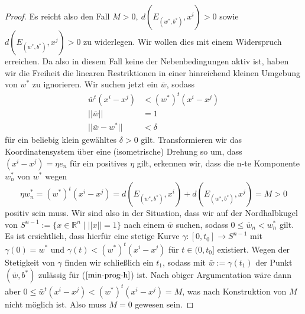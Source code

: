 \begin{proof}
	Es reicht also den Fall $M>0,\ d(E_{(w^*,b^*)},x^i) > 0$ sowie $d(E_{(w^*,b^*)},x^j) > 0$ zu widerlegen. Wir wollen dies mit einem Widerspruch erreichen. Da also in diesem Fall keine der Nebenbedingungen aktiv ist, haben wir die Freiheit die linearen Restriktionen in einer hinreichend kleinen Umgebung von $w^*$ zu ignorieren. Wir suchen jetzt ein $\bar{w}$, sodass
	$$
		\begin{aligned}
		\bar{w}^t(x^i-x^j) &< (w^*)^t(x^i-x^j) \\
		     ||\bar{w}|| &= 1 \\
		 ||\bar{w}-w^*|| &< \delta
		\end{aligned}
	$$
	für ein beliebig klein gewähltes $\delta > 0$ gilt. Transformieren wir das Koordinatensystem über eine (isometrische) Drehung so um, dass $(x^i-x^j)=\eta e_n$ für ein positives $\eta$ gilt, erkennen wir, dass die n-te Komponente $w^*_n$ von $w^*$ wegen
	$$
	\eta w^*_n = (w^*)^t (x^i-x^j) = d(E_{(w^*,b^*)},x^i) + d(E_{(w^*,b^*)},x^j) = M > 0
	$$ 
	positiv sein muss. Wir sind also in der Situation, dass wir auf der Nordhalbkugel von $S^{n-1} := \{x \in \mathbb{R}^n \mid ||x|| = 1 \}$ nach einem $\bar{w}$ suchen, sodass $0 \leq \bar{w}_n < w_n^*$ gilt. Es ist ersichtlich, dass hierfür eine stetige Kurve $\gamma : [0,t_0] \rightarrow S^{n-1}$ mit $\gamma(0) = w^*$ und $ \gamma(t) < (w^*)^t(x^i-x^j)$ für $t \in (0, t_0]$ existiert. Wegen der Stetigkeit von $\gamma$ finden wir schließlich ein $t_1$, sodass mit $\bar{w} := \gamma(t_1)$ der Punkt $(\bar{w},b^*)$ zulässig für ($\ref{min-prog-h}$) ist. Nach obiger Argumentation wäre dann aber $0 \leq \bar{w}^t(x^i-x^j) < (w^*)^t(x^i-x^j) = M$, was nach Konstruktion von $M$ nicht möglich ist. Also muss $M=0$ gewesen sein.
	
\end{proof} 